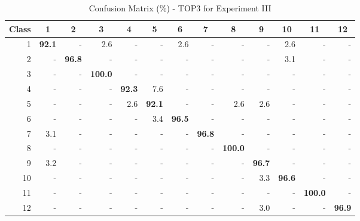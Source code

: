 \documentclass{article}[14pt, oneside, a4paper, times]
\begin{document}
\begin{table} [ht!]
\caption {Confusion Matrix (\%) - TOP3 for Experiment III}
\begin{center}
\begin{tabular}{rrrrrrrrrrrrr} \hline 
 \multicolumn{1}{c}{Class}&
 \multicolumn{1}{c}{1}&
 \multicolumn{1}{c}{2}&
 \multicolumn{1}{c}{3}&
 \multicolumn{1}{c}{4}&
 \multicolumn{1}{c}{5}&
 \multicolumn{1}{c}{6}&
 \multicolumn{1}{c}{7}&
 \multicolumn{1}{c}{8}&
 \multicolumn{1}{c}{9}&
 \multicolumn{1}{c}{10}&
 \multicolumn{1}{c}{11}&
 \multicolumn{1}{c}{12} \\ \hline

1	& \textbf{92.1} 	& -   	& 2.6 	&    - &  	 -  & 	 2.6& 	 -  & 	 - &  	 -  & 	 2.6 &	 -  & 	 - \\  
2	& -   	& \textbf{96.8} 	& -   	&    - &  	 -  & 	 -  & 	 -  & 	 - &  	 -  & 	 3.1 & 	 -  & 	 -  \\ 
3	& -   	& -   	& \textbf{100.0} &	 - &  	 -  & 	 -  & 	 -  & 	 - &  	 -  & 	 -   &	 -  & 	 -  \\ 
4	& -   	& -   	& -   	& \textbf{92.3} &	 7.6 	& -   	& -   	& -   &	 -   	& -   	 &-   	& -   \\
5	& -   	& -   	& -   	& 2.6 	& \textbf{92.1} 	& -   	& -   	& 2.6 &	 2.6 	 &-   	 &-   	& -   \\
6	& -   	& -   	& -   	& -   	& 3.4 	& \textbf{96.5} 	& -   	& -   &	 -   	& -   	 &-   	& -   \\
7	& 3.1 	& -   	& -   	& -   	& -   	& -   	& \textbf{96.8} 	& -   	& -   	& -   	 &-   	& -   \\
8	& -   	& -   	& -   	& -   	& -   	& -   	& -   	& \textbf{100.0}& 	 -  & 	 -   &	 -  & 	 -  \\ 
9	& 3.2 	& -   	& -   	& -   	& -   	& -   	& -   	& -   	& \textbf{96.7} 	& -   	 &-   	 &-   \\
10	& -   	& -   	& -   	& -   	& -   	& -   	& -   	& -   	& 3.3 	& \textbf{96.6} 	 &-   	 &-   \\
11	& -   	& -   	& -   	& -   	& -   	& -   	& -   	& -   	& -   	& -   	 &\textbf{100.0} &	 -  \\ 
12	& -   	& -   	& -   	& -   	& -   	& -   	& -   	& -   	& 3.0 	& -   	 &-   	 &\textbf{96.9} \\ \hline

\end{tabular}
\label{cmIIITOP2:tab}
\end{center}
\end{table}
\end{document}
